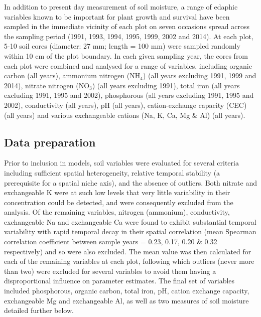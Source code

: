 In addition to present day measurement of soil moisture, a range of edaphic variables known to be important for plant growth and survival have been sampled in the immediate vicinity of each plot on seven occasions spread across the sampling period (1991, 1993, 1994, 1995, 1999, 2002 and 2014). At each plot, 5-10 soil cores (diameter: 27 mm; length = 100 mm) were sampled randomly within 10 cm of the plot boundary. In each given sampling year, the cores from each plot were combined and analysed for a range of variables, including organic carbon (all years), ammonium nitrogen (NH$_{4}$) (all years excluding 1991, 1999 and 2014), nitrate nitrogen (NO$_{3}$) (all years excluding 1991), total iron (all years excluding 1991, 1995 and 2002), phosphorous (all years excluding 1991, 1995 and 2002),  conductivity (all years), pH (all years), cation-exchange capacity (CEC) (all years) and various exchangeable cations (Na, K, Ca, Mg \& Al) (all years).



\subsection{Data preparation}

Prior to inclusion in models, soil variables were evaluated for several criteria including sufficient spatial heterogeneity, relative temporal stability (a prerequisite for a spatial niche axis), and the absence of outliers. Both nitrate and exchangeable K were at such low levels that very little variability in their concentration could be detected, and were consequently excluded from the analysis. Of the remaining variables, nitrogen (ammonium), conductivity, exchangeable Na and exchangeable Ca were found to exhibit substantial temporal variability with rapid temporal decay in their spatial correlation (mean Spearman correlation coefficient between sample years = 0.23, 0.17, 0.20 \& 0.32 respectively) and so were also excluded.
The mean value was then calculated for each of the remaining variables at each plot, following which outliers (never more than two) were excluded for several variables to avoid them having a disproportional influence on parameter estimates. The final set of variables included phosphorous, organic carbon, total iron, pH, cation exchange capacity, exchangeable Mg and exchangeable Al, as well as two measures of soil moisture detailed further below. 

